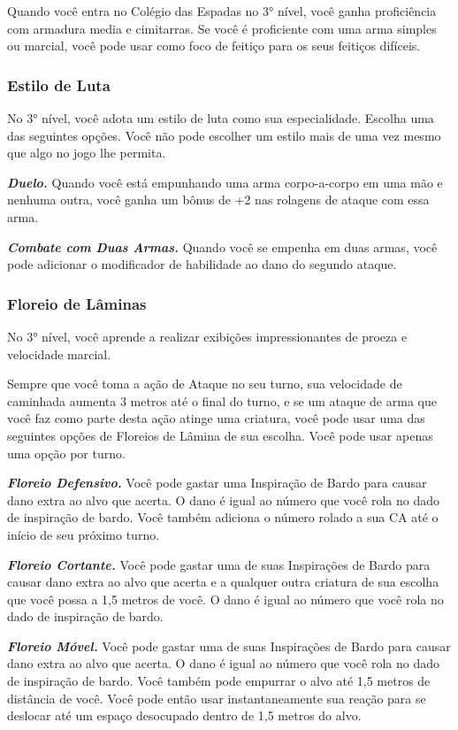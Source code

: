 \documentclass{RPG_Adventure}[2021/10/20]
\begin{document}
\begin{multicols}{2}
Quando você entra no Colégio das Espadas no 3° nível, você ganha proficiência
com armadura media e cimitarras.
Se você é proficiente com uma arma simples ou marcial, você pode usar como foco
de feitiço para os seus feitiços difíceis.

\subsubsection{Estilo de Luta}%

No 3° nível, você adota um estilo de luta como sua especialidade. Escolha uma
das seguintes opções. Você não pode escolher um estilo mais de uma vez mesmo que
algo no jogo lhe permita.

\textit{\textbf{Duelo.}} Quando você está empunhando uma arma corpo-a-corpo em
uma mão e nenhuma outra, você ganha um bônus de +2 nas rolagens de ataque com
essa arma.

\textit{\textbf{Combate com Duas Armas.}} Quando você se empenha em duas armas,
você pode adicionar o modificador de habilidade ao dano do segundo ataque.

\subsubsection{Floreio de Lâminas}%

No 3° nível, você aprende a realizar exibições impressionantes de proeza e
velocidade marcial.

Sempre que você toma a ação de Ataque no seu turno, sua velocidade de caminhada
aumenta 3 metros até o final do turno, e se um ataque de arma que você faz como
parte desta ação atinge uma criatura, você pode usar uma das seguintes opções de
Floreios de Lâmina de sua escolha. Você pode usar apenas uma opção por turno.

\textbf{\textit{Floreio Defensivo.}} Você pode gastar uma Inspiração de Bardo
para causar dano extra ao alvo que acerta. O dano é igual ao número que você
rola no dado de inspiração de bardo. Você também adiciona o número rolado a sua
CA até o início de seu próximo turno.

\textit{\textbf{Floreio Cortante.}} Você pode gastar uma de suas Inspirações de
Bardo para causar dano extra ao alvo que acerta e a qualquer outra criatura de
sua escolha que você possa a 1,5 metros de você. O dano é igual ao número que
você rola no dado de inspiração de bardo.

\textit{\textbf{Floreio Móvel.}} Você pode gastar uma de suas Inspirações de
Bardo para causar dano extra ao alvo que acerta. O dano é igual ao número que
você rola no dado de inspiração de bardo. Você também pode empurrar o alvo até
1,5 metros de distância de você. Você pode então usar instantaneamente sua
reação para se deslocar até um espaço desocupado dentro de 1,5 metros do alvo.


\end{multicols}
\end{document}
